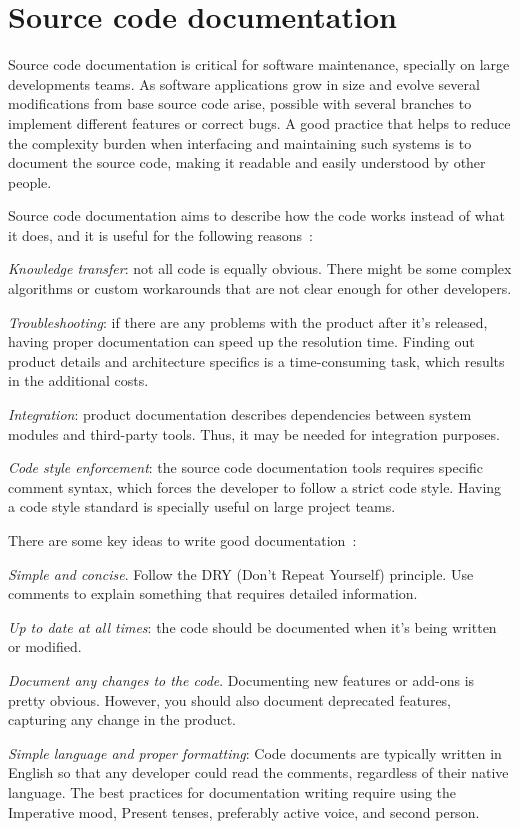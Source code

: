 %
\section{Source code documentation}
\label{sec:source-code-docum}
Source code documentation is critical for software maintenance, specially on
large developments teams. As software applications grow in size and evolve
several modifications from base source code arise, possible with several
branches to implement different features or correct bugs. A good practice that
helps to reduce the complexity burden when interfacing and maintaining such
systems is to document the source code, making it readable and easily understood
by other people.

Source code documentation aims to describe how the code works instead of what it
does, and it is useful for the following
reasons~\cite{sourceCodeDocBestPractices}:
\begin{item-c}
\item \emph{Knowledge transfer}: not all code is equally obvious. There might be
  some complex algorithms or custom workarounds that are not clear enough for
  other developers.
\item \emph{Troubleshooting}: if there are any problems with the product after
  it's released, having proper documentation can speed up the resolution
  time. Finding out product details and architecture specifics is a
  time-consuming task, which results in the additional costs.
\item \emph{Integration}: product documentation
 describes dependencies between system modules and third-party tools. Thus, it
 may be needed for integration purposes.
\item \emph{Code style enforcement}: the source code documentation tools
  requires specific comment syntax, which forces the developer to follow a
  strict code style. Having a code style standard is specially useful on large
  project teams.
\end{item-c}

There are some key ideas to write good documentation~\cite{sourceCodeDocBestPractices}:
\begin{item-c}
\item  
\emph{Simple and concise}. Follow the DRY (Don't Repeat Yourself)
principle. Use comments to explain something that requires detailed information.
\item
  \emph{Up to date at all times}: the code should be documented when it's being
  written or modified.
\item
  \emph{Document any changes to the code}. Documenting new features or add-ons is pretty obvious. However,
 you should also document deprecated features, capturing any change in the
 product.
\item
 \emph{Simple language and proper formatting}: Code documents are typically written in English so that any
 developer could read the comments, regardless of their native language. The best practices for
 documentation writing require using the Imperative mood, Present tenses, preferably active voice, and
 second person.
\end{item-c}

